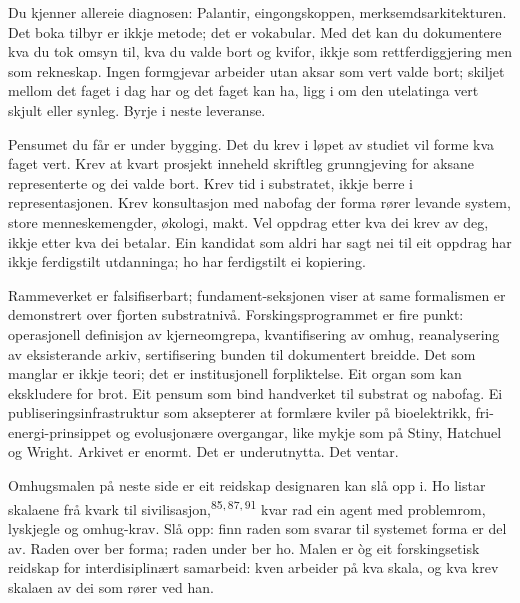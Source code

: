 \begin{widebody}
\begin{foreordbody}

\vspace{2mm}
\vspace{1mm}

Du kjenner allereie diagnosen: Palantir, eingongskoppen, merksemdsarkitekturen. Det boka tilbyr er ikkje metode; det er vokabular. Med det kan du dokumentere kva du tok omsyn til, kva du valde bort og kvifor, ikkje som rettferdiggjering men som rekneskap. Ingen formgjevar arbeider utan aksar som vert valde bort; skiljet mellom det faget i dag har og det faget kan ha, ligg i om den utelatinga vert skjult eller synleg. Byrje i neste leveranse.

\vspace{5mm}
\vspace{1mm}

Pensumet du får er under bygging. Det du krev i løpet av studiet vil forme kva faget vert. Krev at kvart prosjekt inneheld skriftleg grunngjeving for aksane representerte og dei valde bort. Krev tid i substratet, ikkje berre i representasjonen. Krev konsultasjon med nabofag der forma rører levande system, store menneskemengder, økologi, makt. Vel oppdrag etter kva dei krev av deg, ikkje etter kva dei betalar. Ein kandidat som aldri har sagt nei til eit oppdrag har ikkje ferdigstilt utdanninga; ho har ferdigstilt ei kopiering.

\vspace{5mm}
\vspace{1mm}

Rammeverket er falsifiserbart; fundament-seksjonen viser at same formalismen er demonstrert over fjorten substratnivå. Forskingsprogrammet er fire punkt: operasjonell definisjon av kjerneomgrepa, kvantifisering av omhug, reanalysering av eksisterande arkiv, sertifisering bunden til dokumentert breidde. Det som manglar er ikkje teori; det er institusjonell forpliktelse. Eit organ som kan ekskludere for brot. Eit pensum som bind handverket til substrat og nabofag. Ei publiseringsinfrastruktur som aksepterer at formlære kviler på bioelektrikk, fri-energi-prinsippet og evolusjonære overgangar, like mykje som på Stiny, Hatchuel og Wright. Arkivet er enormt. Det er underutnytta. Det ventar.

\vspace{5mm}

Omhugsmalen på neste side er eit reidskap designaren kan slå opp i. Ho listar skalaene frå kvark til sivilisasjon,\textsuperscript{85,\,87,\,91} kvar rad ein agent med problemrom, lyskjegle og omhug-krav. Slå opp: finn raden som svarar til systemet forma er del av. Raden over ber forma; raden under ber ho. Malen er òg eit forskingsetisk reidskap for interdisiplinært samarbeid: kven arbeider på kva skala, og kva krev skalaen av dei som rører ved han.

\end{foreordbody}
\end{widebody}
